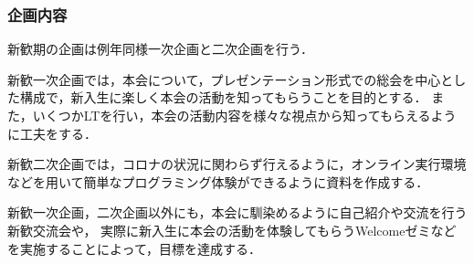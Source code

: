 \subsubsection*{企画内容}
新歓期の企画は例年同様一次企画と二次企画を行う．

新歓一次企画では，本会について，プレゼンテーション形式での総会を中心とした構成で，新入生に楽しく本会の活動を知ってもらうことを目的とする．
また，いくつかLTを行い，本会の活動内容を様々な視点から知ってもらえるように工夫をする．

新歓二次企画では，コロナの状況に関わらず行えるように，オンライン実行環境などを用いて簡単なプログラミング体験ができるように資料を作成する．

新歓一次企画，二次企画以外にも，本会に馴染めるように自己紹介や交流を行う新歓交流会や，
実際に新入生に本会の活動を体験してもらうWelcomeゼミなどを実施することによって，目標を達成する．
